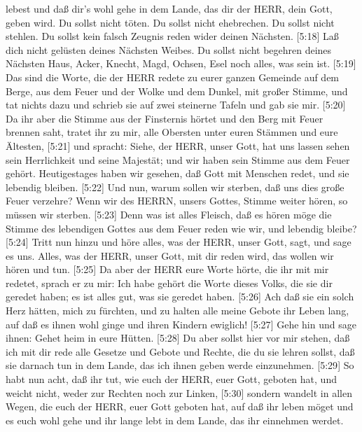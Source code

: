 lebest und daß dir's wohl gehe in dem Lande, das dir der HERR, dein
Gott, geben wird.  Du sollst nicht töten.  Du
sollst nicht ehebrechen.  Du sollst nicht stehlen.
 Du sollst kein falsch Zeugnis reden wider deinen Nächsten.
 {[}5:18{]} Laß dich nicht gelüsten deines Nächsten Weibes.
Du sollst nicht begehren deines Nächsten Haus, Acker, Knecht, Magd,
Ochsen, Esel noch alles, was sein ist.  {[}5:19{]} Das sind
die Worte, die der HERR redete zu eurer ganzen Gemeinde auf dem Berge,
aus dem Feuer und der Wolke und dem Dunkel, mit großer Stimme, und tat
nichts dazu und schrieb sie auf zwei steinerne Tafeln und gab sie mir.
 {[}5:20{]} Da ihr aber die Stimme aus der Finsternis
hörtet und den Berg mit Feuer brennen saht, tratet ihr zu mir, alle
Obersten unter euren Stämmen und eure Ältesten,  {[}5:21{]}
und spracht: Siehe, der HERR, unser Gott, hat uns lassen sehen sein
Herrlichkeit und seine Majestät; und wir haben sein Stimme aus dem Feuer
gehört. Heutigestages haben wir gesehen, daß Gott mit Menschen redet,
und sie lebendig bleiben.  {[}5:22{]} Und nun, warum sollen
wir sterben, daß uns dies große Feuer verzehre? Wenn wir des HERRN,
unsers Gottes, Stimme weiter hören, so müssen wir sterben. 
{[}5:23{]} Denn was ist alles Fleisch, daß es hören möge die Stimme des
lebendigen Gottes aus dem Feuer reden wie wir, und lebendig bleibe?
 {[}5:24{]} Tritt nun hinzu und höre alles, was der HERR,
unser Gott, sagt, und sage es uns. Alles, was der HERR, unser Gott, mit
dir reden wird, das wollen wir hören und tun.  {[}5:25{]}
Da aber der HERR eure Worte hörte, die ihr mit mir redetet, sprach er zu
mir: Ich habe gehört die Worte dieses Volks, die sie dir geredet haben;
es ist alles gut, was sie geredet haben.  {[}5:26{]} Ach
daß sie ein solch Herz hätten, mich zu fürchten, und zu halten alle
meine Gebote ihr Leben lang, auf daß es ihnen wohl ginge und ihren
Kindern ewiglich!  {[}5:27{]} Gehe hin und sage ihnen:
Gehet heim in eure Hütten.  {[}5:28{]} Du aber sollst hier
vor mir stehen, daß ich mit dir rede alle Gesetze und Gebote und Rechte,
die du sie lehren sollst, daß sie darnach tun in dem Lande, das ich
ihnen geben werde einzunehmen.  {[}5:29{]} So habt nun
acht, daß ihr tut, wie euch der HERR, euer Gott, geboten hat, und weicht
nicht, weder zur Rechten noch zur Linken,  {[}5:30{]}
sondern wandelt in allen Wegen, die euch der HERR, euer Gott geboten
hat, auf daß ihr leben möget und es euch wohl gehe und ihr lange lebt in
dem Lande, das ihr einnehmen werdet.

